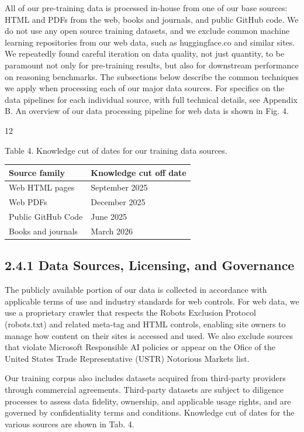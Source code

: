 \documentclass[
  10
]{article}
\newcounter{none} %
\begin{document}
All of our pre-training data is processed in-house from one of our base
sources: HTML and PDFs from the web, books and journals, and public
GitHub code. We do not use any open source training datasets, and we
exclude common machine learning repositories from our web data, such as
huggingface.co and similar sites. We repeatedly found careful iteration
on data quality, not just quantity, to be paramount not only for
pre-training results, but also for downstream performance on reasoning
benchmarks. The subsections below describe the common techniques we
apply when processing each of our major data sources. For specifics on
the data pipelines for each individual source, with full technical
details, see Appendix B. An overview of our data processing pipeline for
web data is shown in Fig. 4.

12

Table 4. Knowledge cut of dates for our training data sources.

{\def\LTcaptype{none} %
\begin{longtable}[]{@{}|l|l|@{}}
\toprule\noalign{}
\endhead
\bottomrule\noalign{}
\endlastfoot
\hline
Source family & Knowledge cut off date \\
\hline
Web HTML pages & September 2025 \\
\hline
Web PDFs & December 2025 \\
\hline
Public GitHub Code & June 2025 \\
\hline
Books and journals & March 2026 \\
\hline
\end{longtable}
}

\subsection{2.4.1 Data Sources, Licensing, and
Governance}\label{data-sources-licensing-and-governance}

The publicly available portion of our data is collected in accordance
with applicable terms of use and industry standards for web controls.
For web data, we use a proprietary crawler that respects the Robots
Exclusion Protocol (robots.txt) and related meta-tag and HTML controls,
enabling site owners to manage how content on their sites is accessed
and used. We also exclude sources that violate Microsoft Responsible AI
policies or appear on the Ofice of the United States Trade
Representative (USTR) Notorious Markets list.

Our training corpus also includes datasets acquired from third-party
providers through commercial agreements. Third-party datasets are
subject to diligence processes to assess data fidelity, ownership, and
applicable usage rights, and are governed by confidentiality terms and
conditions. Knowledge cut of dates for the various sources are shown in
Tab. 4.
\end{document}
